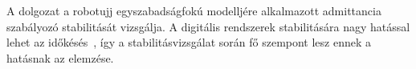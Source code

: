 A dolgozat a robotujj egyszabadságfokú modelljére alkalmazott admittancia szabályozó stabilitását vizsgálja.
A digitális rendszerek stabilitására nagy hatással lehet az időkésés~\cite{stepan1989retarded}, így a 
stabilitásvizsgálat során fő szempont lesz ennek a hatásnak az elemzése.


    
    

